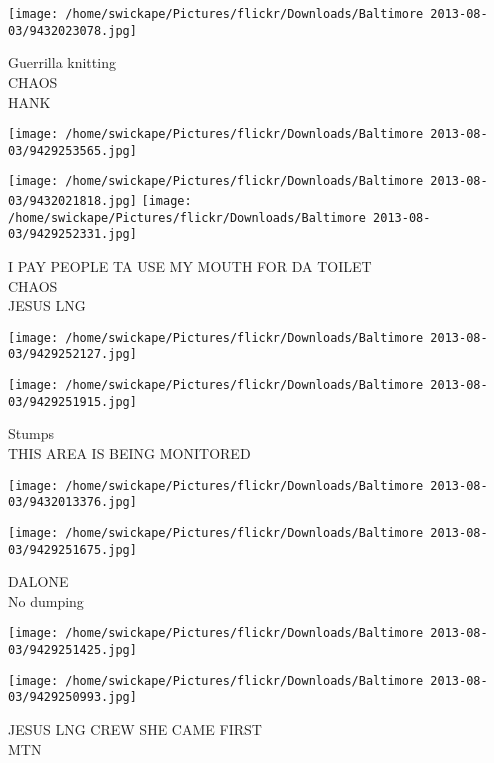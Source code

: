 \documentclass[10pt,letterpaper]{article}
\begin{document}
\texttt{[image: /home/swickape/Pictures/flickr/Downloads/Baltimore 2013-08-03/9432023078.jpg]}

Guerrilla knitting\\
CHAOS\\
HANK\\
\pagebreak

\texttt{[image: /home/swickape/Pictures/flickr/Downloads/Baltimore 2013-08-03/9429253565.jpg]}

\vspace{0.25in}
\texttt{[image: /home/swickape/Pictures/flickr/Downloads/Baltimore 2013-08-03/9432021818.jpg]}
\texttt{[image: /home/swickape/Pictures/flickr/Downloads/Baltimore 2013-08-03/9429252331.jpg]}

I PAY PEOPLE TA USE MY MOUTH FOR DA TOILET\\
CHAOS\\
JESUS LNG\\
\pagebreak

\texttt{[image: /home/swickape/Pictures/flickr/Downloads/Baltimore 2013-08-03/9429252127.jpg]}

\vspace{0.25in}
\texttt{[image: /home/swickape/Pictures/flickr/Downloads/Baltimore 2013-08-03/9429251915.jpg]}

Stumps\\
THIS AREA IS BEING MONITORED\\
\pagebreak

\texttt{[image: /home/swickape/Pictures/flickr/Downloads/Baltimore 2013-08-03/9432013376.jpg]}

\vspace{0.25in}
\texttt{[image: /home/swickape/Pictures/flickr/Downloads/Baltimore 2013-08-03/9429251675.jpg]}

DALONE\\
No dumping\\
\pagebreak

\texttt{[image: /home/swickape/Pictures/flickr/Downloads/Baltimore 2013-08-03/9429251425.jpg]}

\vspace{0.25in}
\texttt{[image: /home/swickape/Pictures/flickr/Downloads/Baltimore 2013-08-03/9429250993.jpg]}

JESUS LNG CREW SHE CAME FIRST\\
MTN\\
\pagebreak
\end{document}
